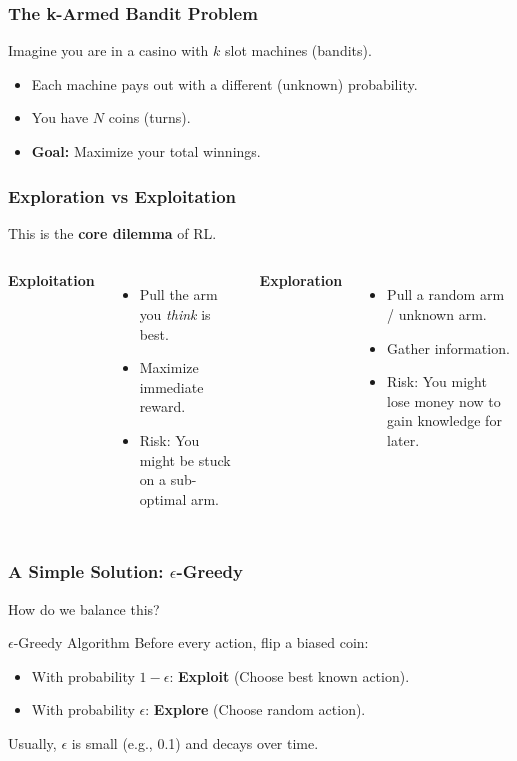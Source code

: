 \documentclass[aspectratio=169]{beamer}
\begin{document}
\begin{frame}
    \frametitle{The k-Armed Bandit Problem}
    Imagine you are in a casino with $k$ slot machines (bandits).
    \begin{itemize}
        \item Each machine pays out with a different (unknown) probability.
        \item You have $N$ coins (turns).
        \item \textbf{Goal:} Maximize your total winnings.
    \end{itemize}
    \centering
\end{frame}

\begin{frame}
    \frametitle{Exploration vs Exploitation}
    This is the \textbf{core dilemma} of RL.
    \vspace{0.5cm}
    \begin{columns}
        \textbf{Exploitation}
        \begin{itemize}
            \item Pull the arm you \textit{think} is best.
            \item Maximize immediate reward.
            \item Risk: You might be stuck on a sub-optimal arm.
        \end{itemize}

        \textbf{Exploration}
        \begin{itemize}
            \item Pull a random arm / unknown arm.
            \item Gather information.
            \item Risk: You might lose money now to gain knowledge for later.
        \end{itemize}
    \end{columns}
\end{frame}

\begin{frame}
    \frametitle{A Simple Solution: $\epsilon$-Greedy}
    How do we balance this?
    \begin{block}{$\epsilon$-Greedy Algorithm}
        Before every action, flip a biased coin:
        \begin{itemize}
            \item With probability $1 - \epsilon$: \textbf{Exploit} (Choose best known action).
            \item With probability $\epsilon$: \textbf{Explore} (Choose random action).
        \end{itemize}
    \end{block}
    Usually, $\epsilon$ is small (e.g., 0.1) and decays over time.
\end{frame}
\end{document}
